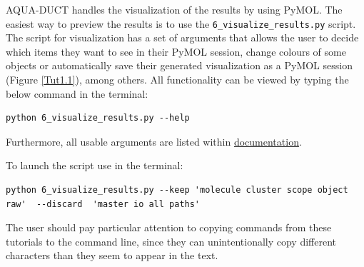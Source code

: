\documentclass[9pt,tutorial]{livecoms}
\begin{document}
AQUA-DUCT handles the visualization of the results by using PyMOL. The easiest way to preview the results is to use the \texttt{6\_visualize\_results.py} script.
The script for visualization has a set of arguments that allows the user to decide which items they want to see in their PyMOL session, change colours of some objects or automatically save their generated visualization as a PyMOL session (Figure \ref{Tut1.1}), among others. All functionality can be viewed by typing the below command in the terminal:
\begin{lstlisting}
python 6_visualize_results.py --help
\end{lstlisting}
Furthermore, all usable arguments are listed within \href{https://tunneling-group.github.io/aqua-duct/valve/valve_manual.html?highlight=visualize\%20results#visualization}{documentation}.

To launch the script use in the terminal:
\begin{lstlisting}[columns=fullflexible]
python 6_visualize_results.py --keep 'molecule cluster scope object raw'  --discard  'master io all paths'
\end{lstlisting}
The user should pay particular attention to copying commands from these tutorials to the command line, since they can unintentionally copy different characters than they seem to appear in the text.
\end{document}

